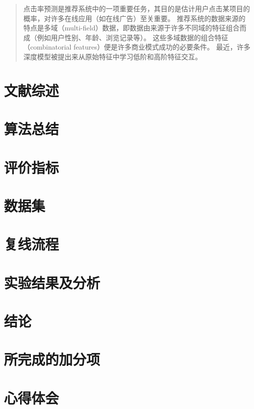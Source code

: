 \documentclass[degree=project,degree-type=project,cjk-font=noto]{thuthesis}
\begin{document}
\maketitle

\frontmatter
\begin{abstract}
  点击率预测是推荐系统中的一项重要任务，其目的是估计用户点击某项目的概率，对许多在线应用（如在线广告）至关重要。
  推荐系统的数据来源的特点是多域（multi-field）数据，即数据由来源于许多不同域的特征组合而成（例如用户性别、年龄、浏览记录等）。
  这些多域数据的组合特征（combinatorial features）便是许多商业模式成功的必要条件。
  最近，许多深度模型被提出来从原始特征中学习低阶和高阶特征交互。

\end{abstract}


\tableofcontents

\listoffigures           %

\mainmatter

\chapter{文献综述}

\chapter{算法总结}

\chapter{评价指标}

\chapter{数据集}

\chapter{复线流程}

\chapter{实验结果及分析}

\chapter{结论}

\chapter{所完成的加分项}

\chapter{心得体会}

\backmatter


\appendix
\end{document}
